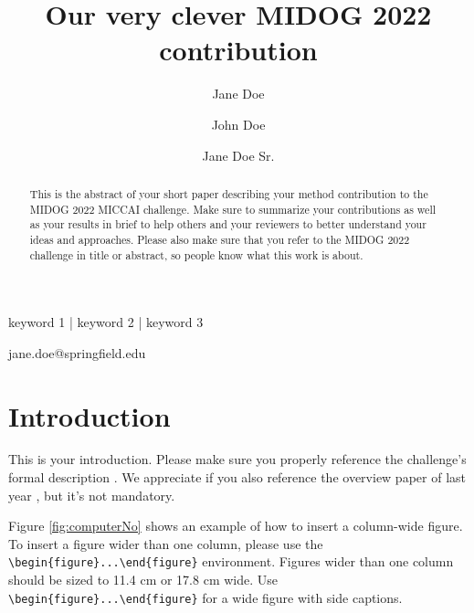 \documentclass[times, twoside, watermark]{zHenriquesLab-StyleBioRxiv}
\begin{document}
\title{Our very clever MIDOG 2022 contribution}

\author[1]{Jane Doe}
\author[2]{John Doe}
\author[1]{Jane Doe Sr.}


\maketitle

\begin{abstract}
This is the abstract of your short paper describing your method contribution to the MIDOG 2022 MICCAI challenge. Make sure to summarize your contributions as well as your results in brief to help others and your reviewers to better understand your ideas and approaches. Please also make sure that you refer to the MIDOG 2022 challenge in title or abstract, so people know what this work is about.

\lipsum[5]
\end {abstract}

\begin{keywords}
keyword 1 | keyword 2 | keyword 3
\end{keywords}

\begin{corrauthor}
jane.doe@springfield.edu
\end{corrauthor}

\section*{Introduction}
This is your introduction. Please make sure you properly reference the challenge's formal description \cite{midog2022}. We appreciate if you also reference the overview paper of last year \cite{midog2021}, but it's not mandatory.

Figure \ref{fig:computerNo} shows an example of how to insert a column-wide figure. To insert a figure wider than one column, please use the \verb|\begin{figure}...\end{figure}| environment. Figures wider than one column should be sized to 11.4 cm or 17.8 cm wide. Use \verb|\begin{figure}...\end{figure}| for a wide figure with side captions.
\end{document}
